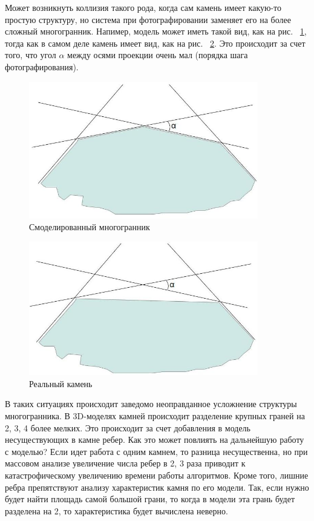 \documentclass[a4paper,12pt, titlepage]{article}
\begin{document}
\begin{flushleft}
  Может возникнуть коллизия такого рода, когда сам камень имеет какую-то простую структуру, но система
при фотографировании заменяет его на более сложный многогранник. Напимер, модель может иметь такой вид,
как на рис. ~\ref{poly-model}, тогда как в самом деле камень имеет вид, как на рис. ~\ref{poly-real}. Это происходит за счет того, что
угол $\alpha$ между осями проекции очень мал (порядка шага фотографирования).
\end{flushleft}
\begin{flushleft}
  \begin{figure}[ht]
    \includegraphics[clip, width=10cm]{img/contour-1.jpg}
    \caption{Смоделированный многогранник}\label{poly-model}
  \end{figure}
  \begin{figure}[ht]
    \includegraphics[clip, width=10cm]{img/contour-2.jpg}
    \caption{Реальный камень}\label{poly-real} 
  \end{figure}
\end{flushleft}
\begin{flushleft}
  В таких ситуациях происходит заведомо неоправданное усложнение структуры многогранника. В 3D-моделях
камней происходит разделение крупных граней на 2, 3, 4 более мелких. Это происходит за счет добавления 
в модель несуществующих в камне ребер. Как это может повлиять на дальнейшую работу с моделью? Если идет работа 
с одним камнем, то разница несущественна, но при массовом анализе увеличение числа ребер в 2, 3 раза приводит
к катастрофическому увеличению времени работы алгоритмов. Кроме того, лишние ребра препятствуют анализу характеристик
камня по его модели. Так, если нужно будет найти площадь самой большой грани, то когда в модели эта грань будет 
разделена на 2, то характеристика будет вычислена неверно.
\end{flushleft}
\end{document}

